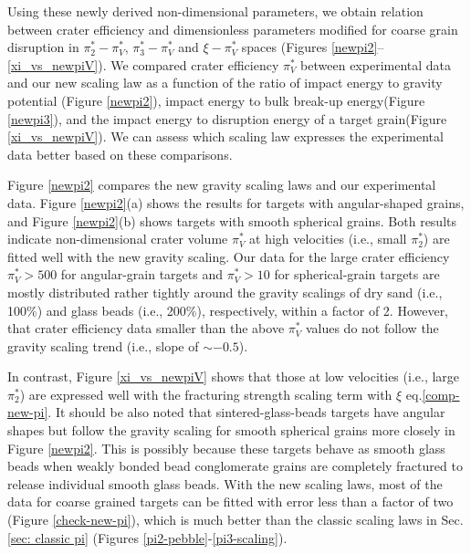 \documentclass[3p,authoryear]{elsarticle}
\begin{document}
Using these newly derived non-dimensional parameters, we obtain relation between crater efficiency and dimensionless parameters modified for coarse grain disruption in $\pi_2^*-\pi_V^*$, $\pi_3^*-\pi_V^*$ and $\xi - \pi_V^*$ spaces (Figures \ref{newpi2}--\ref{xi_vs_newpiV}).
We compared crater efficiency $\pi_V^*$ between experimental data and our new scaling law as a function of the ratio of impact energy to gravity potential (Figure \ref{newpi2}), impact energy to bulk break-up energy(Figure \ref{newpi3}), and the impact energy to disruption energy of a target grain(Figure \ref{xi_vs_newpiV}).
We can assess which scaling law expresses the experimental data better based on these comparisons.

Figure \ref{newpi2} compares the new gravity scaling laws and our experimental data. Figure \ref{newpi2}(a) shows the results for targets with angular-shaped grains, and Figure \ref{newpi2}(b) shows targets with smooth spherical grains.
Both results indicate non-dimensional crater volume $\pi_V^*$ at high velocities (i.e., small $\pi_2^*$) are fitted well with the new gravity scaling.
Our data for the large crater efficiency $\pi_V^*> 500$ for angular-grain targets and $\pi_V^*>10$ for spherical-grain targets are mostly distributed rather tightly around the gravity scalings of dry sand (i.e., 100\%) and glass beads (i.e., 200\%), respectively, within a factor of 2.
However, that crater efficiency data smaller than the above $\pi_V^*$ values do not follow the gravity scaling trend (i.e., slope of $\sim -0.5$).

In contrast, Figure \ref{xi_vs_newpiV} shows that those at low velocities (i.e., large $\pi_2^*$) are expressed well with the fracturing strength scaling term with $\xi$ eq.\eqref{comp-new-pi}.
It should be also noted that sintered-glass-beads targets have angular shapes but follow the gravity scaling for smooth spherical grains more closely in Figure \ref{newpi2}.
This is possibly because these targets behave as smooth glass beads when weakly bonded bead conglomerate grains are completely fractured to release individual smooth glass beads.
With the new scaling laws, most of the data for coarse grained targets can be fitted with error less than a factor of two (Figure \ref{check-new-pi}), which is much better than the classic scaling laws in Sec. \ref{sec: classic pi} (Figures \ref{pi2-pebble}-\ref{pi3-scaling}).
\end{document}
